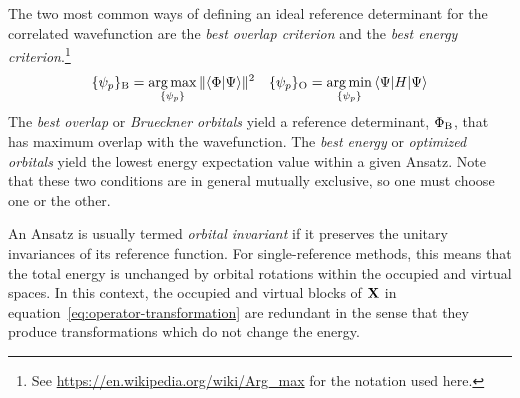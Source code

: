 \documentclass[11pt]{article}
\numberwithin{equation}{section}
\begin{document}
\begin{rmk}
The two most common ways of defining an ideal reference determinant for the correlated wavefunction are the \textit{best overlap criterion} and the \textit{best energy criterion}.\footnote{See \url{https://en.wikipedia.org/wiki/Arg_max} for the notation used here.}
\begin{align}
\label{eq:brueckner-and-oo-general-condition}
  \{\psi _p\}_{\mathrm{B}}
=
  \underset{\{\psi _p\}}{\arg\max}\,
  \|\langle\Phi |\Psi \rangle\|^2
&&
  \{\psi _p\}_{\mathrm{O}}
=
  \underset{\{\psi _p\}}{\arg\min}\,
  \langle\Psi |H|\Psi \rangle
\end{align}
The \textit{best overlap} or \textit{Brueckner orbitals} yield a reference determinant, $\Phi _{\mathrm{B}}$, that has maximum overlap with the wavefunction.
The \textit{best energy} or \textit{optimized orbitals} yield the lowest energy expectation value within a given Ansatz.
Note that these two conditions are in general mutually exclusive, so one must choose one or the other.
\end{rmk}

\begin{dfn}
An Ansatz is usually termed \textit{orbital invariant} if it preserves the unitary invariances of its reference function.
For single-reference methods, this means that the total energy is unchanged by orbital rotations within the occupied and virtual spaces.
In this context, the occupied and virtual blocks of $\mathbf{X}$ in equation~\ref{eq:operator-transformation} are redundant in the sense that they produce transformations which do not change the energy.
\end{dfn}
\end{document}
